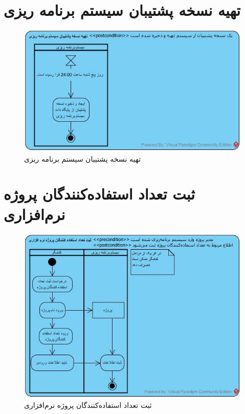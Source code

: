 \section{تهیه نسخه پشتیبان سیستم برنامه ریزی}
\begin{figure}[H]
	\centering
	\includegraphics[scale=0.8]{img/activity/Support}
	\caption{تهیه نسخه پشتیبان سیستم برنامه ریزی}
\end{figure}

\section{ثبت تعداد استفاده‌کنندگان پروژه نرم‌افزاری}
\begin{figure}[H]
	\centering
	\includegraphics[scale=0.8]{img/activity/AddUsersCount}
	\caption{ثبت تعداد استفاده‌کنندگان پروژه نرم‌افزاری}
\end{figure}


